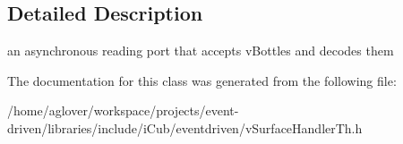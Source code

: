 \subsection{Detailed Description}
an asynchronous reading port that accepts v\+Bottles and decodes them 

The documentation for this class was generated from the following file\+:\begin{DoxyCompactItemize}
\item 
/home/aglover/workspace/projects/event-\/driven/libraries/include/i\+Cub/eventdriven/v\+Surface\+Handler\+Th.\+h\end{DoxyCompactItemize}
